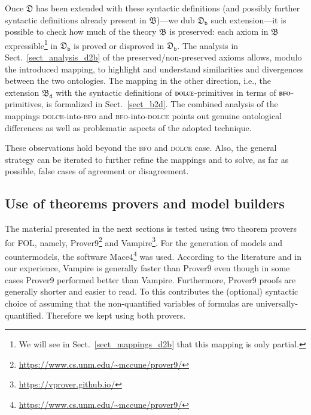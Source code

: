 \documentclass[ao]{iosart2x}
\newcommand{\nb}[1]{\textcolor{red}{$|$}\marginpar{\hspace*{-0cm}\parbox{20mm}{\scriptsize\raggedright\textcolor{red}{#1}}}}
\newcommand{\dolce}{{\textsc{dolce}}}
\newcommand{\bfo}{{\textsc{bfo}}}
\newcommand {\thdolce} {\ensuremath{\mathfrak{D}}}
\newcommand {\thbfo} {\ensuremath{\mathfrak{B}}}
\newcommand {\thbfobdmap} {\ensuremath{\mathfrak{B}_\texttt{d}}}
\newcommand {\thdolcedbmap} {\ensuremath{\mathfrak{D}_\texttt{b}}}
\begin{document}
Once {$\thdolce$} has been extended with these syntactic definitions (and possibly further syntactic definitions already present in {$\thbfo$})---we dub $\thdolcedbmap$ such extension---it is possible to check how much of the theory $\thbfo$ is preserved: each axiom in $\thbfo$ expressible\footnote{We will see in Sect.~\ref{sect_mappings_d2b} that this mapping is only partial.} in $\thdolcedbmap$ is proved or disproved in $\thdolcedbmap$. The analysis in Sect.~\ref{sect_analysis_d2b} of the preserved/non-preserved axioms allows, modulo the introduced mapping, to highlight and understand similarities and divergences between the two ontologies. The mapping in the other direction, i.e., the extension $\thbfobdmap$ with the syntactic definitions of {$\dolce$}-primitives in terms of {$\bfo$}-primitives, is formalized in Sect.~\ref{sect_b2d}. The combined analysis of the mappings {\dolce}-into-{\bfo} and {\bfo}-into-{\dolce} points out genuine ontological differences as well as problematic aspects of the adopted technique. 

These observations hold beyond the {\bfo} and {\dolce} case. Also, the general strategy can be iterated to further refine the mappings and to solve, as far as possible, false cases of agreement or disagreement.

\subsection{Use of theorems provers and model builders}

The material presented in the next sections is tested using two theorem provers for FOL, namely, Prover9\footnote{\url{https://www.cs.unm.edu/~mccune/prover9/}} and Vampire\footnote{\url{https://vprover.github.io/}}. For the generation of models and countermodels, the software Mace4\footnote{\url{https://www.cs.unm.edu/~mccune/prover9/}} was used.
According to the literature \citep{Sut16} and in our experience, Vampire is generally faster than Prover9 even though in some cases Prover9 performed better than Vampire. %
Furthermore, Prover9 proofs are generally shorter and easier to read. To this contributes the (optional) syntactic choice of assuming that the non-quantified variables of formulas are universally-quantified. %
Therefore we kept using both provers. 
\end{document}
